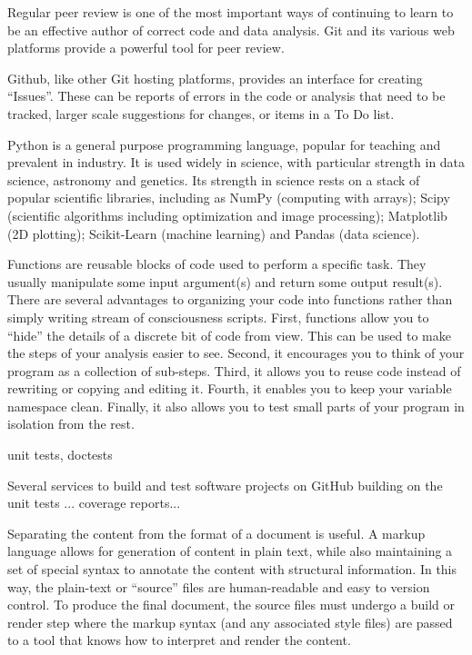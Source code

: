 Regular peer review is one of the most important ways of continuing to learn
to be an effective author of correct code and data analysis.  Git and its
various web platforms provide a powerful tool for peer review.

Github, like other Git hosting platforms, provides an interface for creating
``Issues''.  These can be reports of errors in the code or analysis that need
to be tracked, larger scale suggestions for changes, or items in a To Do list.



Python is a general purpose programming language,
popular for teaching and prevalent in industry.
It is used widely in science, with particular strength in data science,
astronomy and genetics.
Its strength in science rests on a stack of popular scientific libraries, including
as NumPy (computing with arrays); Scipy (scientific algorithms
including optimization and image processing); Matplotlib (2D plotting);
Scikit-Learn (machine learning) and Pandas (data science).

Functions are reusable blocks of code used to perform a specific task.
They usually manipulate some input argument(s) and return some output
result(s).
There are several advantages to organizing your code into functions rather
than simply writing stream of consciousness scripts.
First, functions allow you to ``hide'' the details of a discrete bit of
code from view.
This can be used to make the steps of your analysis easier to see.
Second, it encourages you to think of your program as a collection of sub-steps.
Third, it allows you to reuse code instead of rewriting or copying and editing
it.
Fourth, it enables you to keep your variable namespace clean.
Finally, it also allows you to test small parts of your program in isolation
from the rest.

unit tests, doctests


Several services to build and test software projects on GitHub 
building on the unit tests ...
coverage reports...

Separating the content from the format of a document is useful.
A markup language allows for generation of content in plain text, while also
maintaining a set of special syntax to annotate the content with structural
information.
In this way, the plain-text or ``source'' files are human-readable and easy to
version control.
To produce the final document, the source files must undergo a build or render
step where the markup syntax (and any associated style files) are passed to a
tool that knows how to interpret and render the content.

